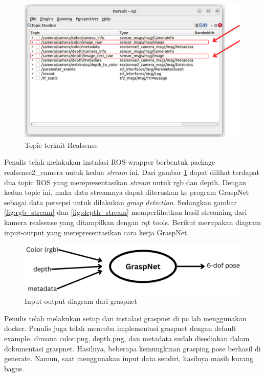 \begin{figure} [H] \centering
    \includegraphics[scale=0.6]{gambar/topic realsense anotated.png}
    \caption{Topic terkait Realsense}
    \label{fig:realsense_topic}
\end{figure}
Penulis telah melakukan instalasi ROS-wrapper berbentuk package realsense2\_camera untuk kedua \emph{stream} ini.
Dari gambar \ref{fig:realsense_topic} dapat dilihat terdapat dua topic ROS yang merepresentasikan \emph{stream} untuk rgb dan depth. Dengan kedua topic ini,
maka data streamnya dapat diteruskan ke program GraspNet sebagai data persepsi untuk dilakukan \emph{grasp detection}. Sedangkan gambar \ref{fig:rgb_stream}
dan \ref{fig:depth_stream} memperlihatkan hasil streaming dari kamera realsense yang ditampilkan dengan rqt tools.
Berikut merupakan diagram input-output yang merepresentasikan cara kerja GraspNet.

\begin{figure} [H] \centering
    \includegraphics[scale=0.7]{gambar/graspnet idea.png}
    \caption{Input output diagram dari graspnet}
    \label{fig:graspnet idea}
\end{figure}

Penulis telah melakukan setup dan instalasi graspnet di pc lab menggunakan docker. 
Penulis juga telah mencoba implementasi graspnet dengan default example, dimana color.png, depth.png, dan metadata sudah disediakan dalam dokumentasi graspnet.
Hasilnya, beberapa kemungkinan grasping pose berhasil di generate. Namun, saat menggunakan input data sendiri, hasilnya masih kurang bagus.

